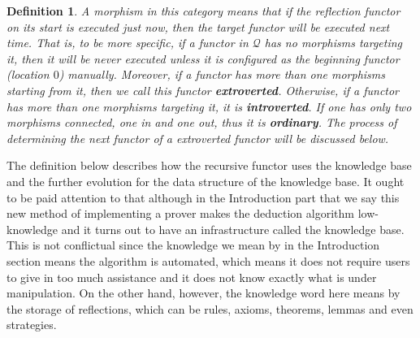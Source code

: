 \documentclass{aims}
\newtheorem{definition}{Definition}	%
\numberwithin{theorem}{section}	%
\numberwithin{axiom}{section}	%
\numberwithin{definition}{section}	%
\begin{document}
\begin{definition}
A morphism in this category means that if the reflection functor on its start is executed just now, then the target functor will be executed next time. That is, to be more specific, if a functor in \(\mathcal{Q}\) has no morphisms targeting it, then it will be never executed unless it is configured as the beginning functor (location \(0\)) manually. Moreover, if a functor has more than one morphisms starting from it, then we call this functor \textbf{ extroverted}. Otherwise, if a functor has more than one morphisms targeting it, it is \textbf{ introverted}. If one has only two morphisms connected, one in and one out, thus it is\textbf{  ordinary}. The process of determining the next functor of a extroverted functor will be discussed below.
\end{definition}

The definition below describes how the recursive functor uses the knowledge base and the further evolution for the data structure of the knowledge base. It ought to be paid attention to that although in the Introduction part that we say this new method of implementing a prover makes the deduction algorithm low-knowledge and it turns out to have an infrastructure called the knowledge base. This is not conflictual since the knowledge we mean by in the Introduction section means the algorithm is automated, which means it does not require users to give in too much assistance and it does not know exactly what is under manipulation. On the other hand, however, the knowledge word here means by the storage of reflections, which can be rules, axioms, theorems, lemmas and even strategies.
\end{document}
